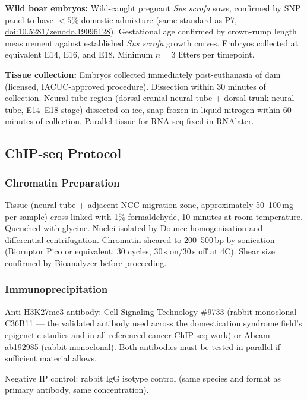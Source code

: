 \documentclass[10pt, a4paper]{article}
\begin{document}
\textbf{Wild boar embryos:}
Wild-caught pregnant \textit{Sus scrofa}
sows, confirmed by SNP panel to have
$< 5\%$ domestic admixture (same standard
as P7,
\href{https://doi.org/10.5281/zenodo.19096128}
{doi:10.5281/zenodo.19096128}).
Gestational age confirmed by
crown-rump length measurement against
established \textit{Sus scrofa} growth
curves. Embryos collected at equivalent
E14, E16, and E18. Minimum $n = 3$
litters per timepoint.

\textbf{Tissue collection:}
Embryos collected immediately post-euthanasia
of dam (licensed, IACUC-approved procedure).
Dissection within 30 minutes of collection.
Neural tube region (dorsal cranial neural tube
+ dorsal trunk neural tube, E14--E18 stage)
dissected on ice, snap-frozen in liquid
nitrogen within 60 minutes of collection.
Parallel tissue for RNA-seq fixed in RNAlater.

\subsection{ChIP-seq Protocol}

\subsubsection{Chromatin Preparation}

Tissue (neural tube + adjacent NCC migration
zone, approximately 50--100\,mg per sample)
cross-linked with 1\% formaldehyde, 10 minutes
at room temperature. Quenched with glycine.
Nuclei isolated by Dounce homogenisation
and differential centrifugation.
Chromatin sheared to 200--500\,bp by sonication
(Bioruptor Pico or equivalent: 30 cycles,
30\,s on/30\,s off at 4\textdegree C).
Shear size confirmed by Bioanalyzer before
proceeding.

\subsubsection{Immunoprecipitation}

Anti-H3K27me3 antibody:
Cell Signaling Technology \#9733
(rabbit monoclonal C36B11 --- the validated
antibody used across the domestication
syndrome field's epigenetic studies and
in all referenced cancer ChIP-seq work)
or Abcam ab192985 (rabbit monoclonal).
Both antibodies must be tested in parallel
if sufficient material allows.

Negative IP control: rabbit IgG isotype
control (same species and format as primary
antibody, same concentration).
\end{document}

